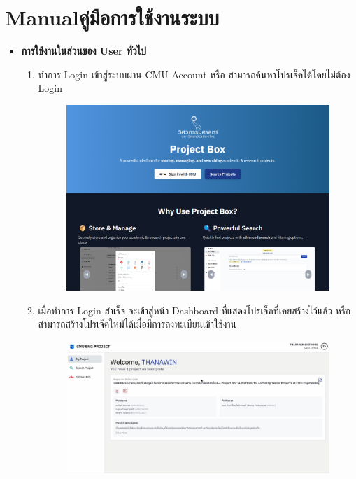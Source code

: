 \chapter{\ifenglish Manual\else คู่มือการใช้งานระบบ\fi}
\begin{itemize}
    \item \textbf{การใช้งานในส่วนของ User ทั่วไป}
\begin{enumerate}
    \item ทำการ Login เข้าสู่ระบบผ่าน CMU Account หรือ สามารถค้นหาโปรเจ็คได้โดยไม่ต้อง Login 
    \begin{figure}[H]
    \centering
    \includegraphics[width=130mm, keepaspectratio ]{pictures/project_box/loginpage.png}
    \end{figure}
    \vspace{1cm}
    \item เมื่อทำการ Login สำเร็จ จะเข้าสู่หน้า Dashboard ที่แสดงโปรเจ็คที่เคยสร้างไว้แล้ว หรือสามารถสร้างโปรเจ็คใหม่ได้เมื่อมีการลงทะเบียนเข้าใช้งาน
    \begin{figure}[H]
        \centering
        \includegraphics[width=130mm, keepaspectratio ]{pictures/project_box/dashboard.png
}
\end{figure}
\end{enumerate}
\end{itemize}

